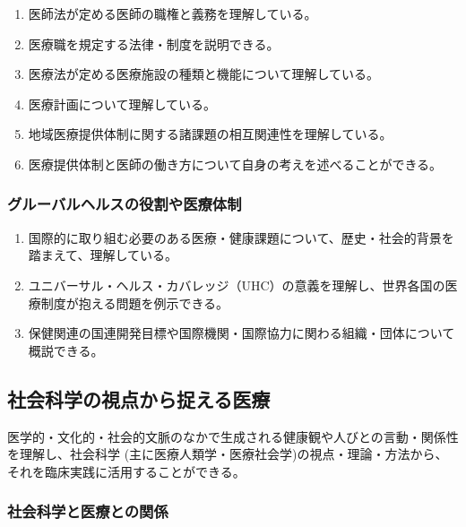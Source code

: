 \begin{enumerate}
\def\labelenumi{\arabic{enumi}.}
\tightlist
\item
  医師法が定める医師の職権と義務を理解している。
\item
  医療職を規定する法律・制度を説明できる。
\item
  医療法が定める医療施設の種類と機能について理解している。
\item
  医療計画について理解している。
\item
  地域医療提供体制に関する諸課題の相互関連性を理解している。
\item
  医療提供体制と医師の働き方について自身の考えを述べることができる。
\end{enumerate}

\hypertarget{ux30b0ux30ebux30fcux30d0ux30ebux30d8ux30ebux30b9ux306eux5f79ux5272ux3084ux533bux7642ux4f53ux5236}{%
\subsubsection{グルーバルヘルスの役割や医療体制}\label{ux30b0ux30ebux30fcux30d0ux30ebux30d8ux30ebux30b9ux306eux5f79ux5272ux3084ux533bux7642ux4f53ux5236}}

\begin{enumerate}
\def\labelenumi{\arabic{enumi}.}
\tightlist
\item
  国際的に取り組む必要のある医療・健康課題について、歴史・社会的背景を踏まえて、理解している。
\item
  ユニバーサル・ヘルス・カバレッジ（UHC）の意義を理解し、世界各国の医療制度が抱える問題を例示できる。
\item
  保健関連の国連開発目標や国際機関・国際協力に関わる組織・団体について概説できる。
\end{enumerate}

\hypertarget{ux793eux4f1aux79d1ux5b66ux306eux8996ux70b9ux304bux3089ux6349ux3048ux308bux533bux7642}{%
\subsection{社会科学の視点から捉える医療}\label{ux793eux4f1aux79d1ux5b66ux306eux8996ux70b9ux304bux3089ux6349ux3048ux308bux533bux7642}}

医学的・文化的・社会的文脈のなかで生成される健康観や人びとの言動・関係性を理解し、社会科学
(主に医療人類学・医療社会学)の視点・理論・方法から、それを臨床実践に活用することができる。

\hypertarget{ux793eux4f1aux79d1ux5b66ux3068ux533bux7642ux3068ux306eux95a2ux4fc2}{%
\subsubsection{社会科学と医療との関係}\label{ux793eux4f1aux79d1ux5b66ux3068ux533bux7642ux3068ux306eux95a2ux4fc2}}


